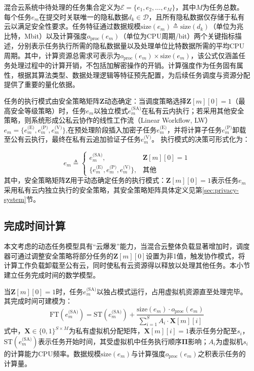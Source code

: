 混合云系统中待处理的任务集合定义为$\mathcal{E} = \{e_1, e_2, \dots, e_M\}$，其中$M$为任务总数。每个任务$e_m$在提交时关联唯一的隐私数据$d_k \in \mathcal{D}$，且所有隐私数据仅存储于私有云以满足安全性要求。任务特征通过数据规模$\text{size}(e_m) \triangleq \text{size}(d_k)$（单位为兆比特，Mbit）以及计算强度$o_{\text{proc}}(e_m)$（单位为CPU周期/bit）两个关键指标描述，分别表示任务执行所需的隐私数据量以及处理单位比特数据所需的平均CPU周期。其中，计算资源总需求可表示为$o_{\text{proc}}(e_m) \times \text{size}(e_m)$，该公式仅涵盖任务处理过程中的计算开销，不包括加解密操作的开销。计算强度作为任务固有属性，根据其算法类型、数据处理逻辑等特征预先配置\cite{fanCollaborativeServicePlacement2024}，为后续任务调度与资源分配提供了重要的量化依据。

任务的执行模式由安全策略矩阵$\mathbf{Z}$动态确定：当调度策略选择$\mathbf{Z}[m][0]=1$（最高安全等级策略）时，任务$e_m$以独立模式$e_m^{\text{(SA)}}$在私有云内执行；若采用其他安全策略，则系统形成公私云协作的线性工作流（Linear Workflow, LW）\cite{stavrinidesMulticriteriaSchedulingLinear2021} $e_m = \{e_m^\text{(E)}, e_m^\text{(P)}, e_m^\text{(V)}\}$,在预处理阶段插入加密子任务$e_m^\text{(E)}$，并将计算子任务$e_m^\text{(P)}$卸载至公有云执行，最终在私有云追加验证子任务$e_m^\text{(V)}$。
执行模式的决策可形式化为：

\begin{equation}
    e_m \triangleq
    \begin{cases}
        e_m^{\text{(SA)}}, & \mathbf{Z}[m][0]=1 \\
        \{e_m^\text{(E)}, e_m^\text{(P)}, e_m^\text{(V)}\}, & \text{其他}
    \end{cases}
\end{equation}
其中，安全策略矩阵$\mathbf{Z}$用于动态确定任务的执行模式：$\mathbf{Z}[m][0]=1$表示任务$e_m$采用私有云内独立执行的安全策略，其安全策略矩阵具体定义见第\ref{sec:privacy-system}节。

\subsection{完成时间计算}

本文考虑的动态任务模型具有“云爆发”能力，当混合云整体负载显著增加时，调度器可通过调整安全策略将部分任务的$\mathbf{Z}[m][0]$设置为非1值，触发协作模式，将计算工作负载卸载至公有云，同时使私有云资源得以释放以处理其他任务。本小节建立任务完成时间的数学模型。

当$\mathbf{Z}[m][0] = 1$时，任务$e_m^{\text{(SA)}}$以独占模式运行，占用虚拟机资源直至处理完毕。其完成时间可建模为：
\begin{equation}
    \text{FT}(e_m^{\text{(SA)}}) = \text{ST}(e_m^{\text{(SA)}}) + \frac{\text{size}(e_m) \cdot o_{\text{proc}}(e_m)}{\sum_{i=1}^S A_i \cdot \mathbf{X}[m][i]}
    \label{eq:sa-finish-time}
\end{equation}
式中，$\mathbf{X} \in \{0,1\}^{S \times M}$为私有虚拟机分配矩阵，$\mathbf{X}[m][i]=1$表示任务分配至$s_i$，$\text{ST}(e_m^{\text{(SA)}})$表示任务开始时间，其受虚拟机中任务执行顺序\(\mathbf{\Pi}\)影响；$A_i$为虚拟机$s_i$的计算能力CPU频率。数据规模$\text{size}(e_m)$与计算强度$o_{\text{proc}}(e_m)$之积表示任务的计算量。

